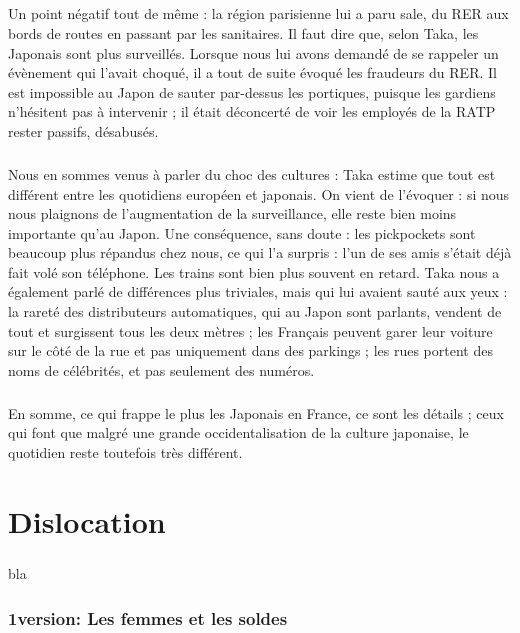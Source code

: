 \paragraph{}
Un point négatif tout de même : la région parisienne lui a paru sale, du RER aux bords de routes en passant par les sanitaires. Il faut dire que, selon Taka, les Japonais sont plus surveillés. Lorsque nous lui avons demandé de se rappeler un évènement qui l’avait choqué, il a tout de suite évoqué les fraudeurs du RER. Il est impossible au Japon de sauter par-dessus les portiques, puisque les gardiens n’hésitent pas à intervenir ; il était déconcerté de voir les employés de la RATP rester passifs, désabusés.
\paragraph{}
Nous en sommes venus à parler du choc des cultures : Taka estime que tout est différent entre les quotidiens européen et japonais. On vient de l’évoquer : si nous nous plaignons de l’augmentation de la surveillance, elle reste bien moins importante qu’au Japon. Une conséquence, sans doute : les pickpockets sont beaucoup plus répandus chez nous, ce qui l’a surpris : l’un de ses amis s’était déjà fait volé son téléphone. Les trains sont bien plus souvent en retard. Taka nous a également parlé de différences plus triviales, mais qui lui avaient sauté aux yeux : la rareté des distributeurs automatiques, qui au Japon sont parlants, vendent de tout et surgissent tous les deux mètres ; les Français peuvent garer leur voiture sur le côté de la rue et pas uniquement dans des parkings ; les rues portent des noms de célébrités, et pas seulement des numéros.
\paragraph{}
En somme, ce qui frappe le plus les Japonais en France, ce sont les détails ; ceux qui font que malgré une grande occidentalisation de la culture japonaise, le quotidien reste toutefois très différent.



\chapter{Dislocation}
\paragraph{}
bla

\subsection{1\ier version: Les femmes et les soldes}
